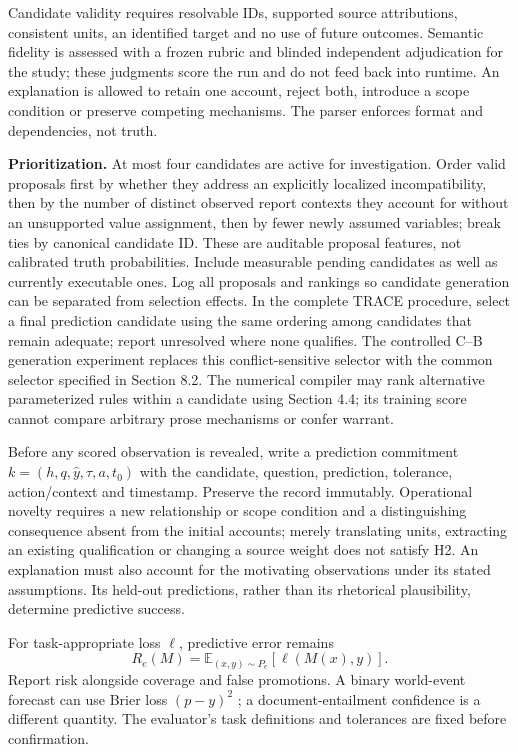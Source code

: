\documentclass[11pt,a4paper]{article}
\begin{document}
Candidate validity requires resolvable IDs, supported source
attributions, consistent units, an identified target and no use of
future outcomes. Semantic fidelity is assessed with a frozen rubric and
blinded independent adjudication for the study; these judgments score
the run and do not feed back into runtime. An explanation is allowed to
retain one account, reject both, introduce a scope condition or preserve
competing mechanisms. The parser enforces format and dependencies, not
truth.

\textbf{Prioritization.} At most four candidates are active for
investigation. Order valid proposals first by whether they address an
explicitly localized incompatibility, then by the number of distinct
observed report contexts they account for without an unsupported value
assignment, then by fewer newly assumed variables; break ties by
canonical candidate ID. These are auditable proposal features, not
calibrated truth probabilities. Include measurable pending candidates as
well as currently executable ones. Log all proposals and rankings so
candidate generation can be separated from selection effects. In the
complete TRACE procedure, select a final prediction candidate using the
same ordering among candidates that remain adequate; report unresolved
where none qualifies. The controlled C--B generation experiment replaces
this conflict-sensitive selector with the common selector specified in
Section 8.2. The numerical compiler may rank alternative parameterized
rules within a candidate using Section 4.4; its training score cannot
compare arbitrary prose mechanisms or confer warrant.

Before any scored observation is revealed, write a prediction commitment
\(k=(h,q,\hat y,\tau,a,t_0)\) with the candidate, question, prediction,
tolerance, action/context and timestamp. Preserve the record immutably.
Operational novelty requires a new relationship or scope condition and a
distinguishing consequence absent from the initial accounts; merely
translating units, extracting an existing qualification or changing a
source weight does not satisfy H2. An explanation must also account for
the motivating observations under its stated assumptions. Its held-out
predictions, rather than its rhetorical plausibility, determine
predictive success.

For task-appropriate loss \(\ell\), predictive error remains \[
R_e(M)=\mathbb E_{(x,y)\sim P_e}[\ell(M(x),y)].
\] Report risk alongside coverage and false promotions. A binary
world-event forecast can use Brier loss \((p-y)^2\) \citep{R22}; a
document-entailment confidence is a different quantity. The evaluator's
task definitions and tolerances are fixed before confirmation.
\end{document}
